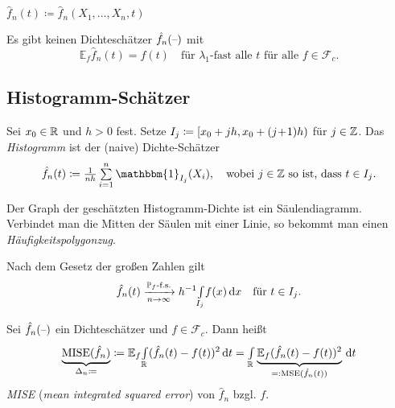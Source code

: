 \documentclass{cheat-sheet}
\renewcommand{\P}{\mathbb{P}} %
\newcommand{\E}{\mathbb{E}} %
\newcommand{\ind}{\mathbbm{1}} %
\DeclareMathOperator{\MISE}{MISE} %
\DeclareMathOperator{\MSE}{MSE} %
\begin{document}
\begin{nota}
  $\hat{f}_n(t) \coloneqq \hat{f}_n(X_1, \ldots, X_n, t)$
\end{nota}

\begin{lem}
  Es gibt keinen Dichteschätzer $\hat{f}_n(\text{--})$ mit
  \[
    \E_f \hat{f}_n(t) = f(t) \quad
    \text{für $\lambda_1$-fast alle $t$ für alle $f \in \mathcal{F}_c$.}
  \]
\end{lem}

\subsection{Histogramm-Schätzer}

\begin{defn}
  Sei $x_0 \in \mathbb{R}$ und $h > 0$ fest.
  Setze $I_j \coloneqq \left[ x_0 + jh, x_0 + (j\!+\!1) h \right)$ für $j \in \mathbb{Z}$.
  Das \emph{Histogramm} ist der (naive) Dichte-Schätzer
  \[
    \hat{f}_n(t) \coloneqq \tfrac{1}{nh} \sum_{i=1}^n \ind_{I_j}(X_i), \quad
    \text{wobei $j \in \Z$ so ist, dass $t \in I_j$}.
  \]
\end{defn}

\begin{bem}
  Der Graph der geschätzten Histogramm-Dichte ist ein Säulendiagramm.
  Verbindet man die Mitten der Säulen mit einer Linie, so bekommt man einen \emph{Häufigkeitspolygonzug}.
\end{bem}

\begin{bem}
  Nach dem Gesetz der großen Zahlen gilt
  \[
    \hat{f}_n(t) \xra[n \to \infty]{\text{$\P_f$-f.s.}}
    h^{-1} \Int{I_j}{}{f(x)}{x} \quad
    \text{für $t \in I_j$.}
  \]
\end{bem}

\begin{defn}
  Sei $\hat{f}_n(\text{--})$ ein Dichteschätzer und $f \in \mathcal{F}_c$.
  Dann heißt
  \[
    \underbrace{\MISE(\hat{f}_n)}_{\Delta_n \coloneqq} \coloneqq
    \E_f \Int{\R}{}{(\hat{f}_n(t) - f(t))^2}{t} =
    \Int{\R}{}{\underbrace{\E_f (\hat{f}_n(t) - f(t))^2}_{=: \MSE(\hat{f}_n(t))}}{t}
  \]
  \emph{MISE} (\textit{mean integrated squared error}) von $\hat{f}_n$ bzgl. $f$.
\end{defn}
\end{document}
